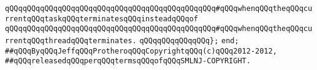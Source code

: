 \verb|qQQqqQQqqQQqqQQqqQQqqQQqqQQqqQQqqQQqqQQqqQQqqQQq#qQQqwhenqQQqtheqQQqcurrentqQQqtaskqQQqterminatesqQQqinsteadqQQqof|\newline
\verb|qQQqqQQqqQQqqQQqqQQqqQQqqQQqqQQqqQQqqQQqqQQqqQQq#qQQqwhenqQQqtheqQQqcurrentqQQqthreadqQQqterminates.|\newline
\verb|qQQqqQQqqQQqqQQq};|\newline
\verb|end;|\newline
\newline
\verb|##qQQqByqQQqJeffqQQqProtheroqQQqCopyrightqQQq(c)qQQq2012-2012,|\newline
\verb|##qQQqreleasedqQQqperqQQqtermsqQQqofqQQqSMLNJ-COPYRIGHT.|\newline

